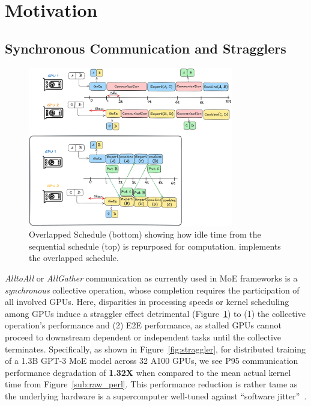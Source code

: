 \section{Motivation}\label{sec:motivation}
\subsection{Synchronous Communication and Stragglers}\label{sec:synchronous-communication-and-stragglers}
\begin{figure}[!ht]
    \centering
    \includegraphics[width=0.8\textwidth, keepaspectratio]{figures/s_overlap}
    \caption{Overlapped Schedule (bottom) showing how idle time from the sequential schedule (top)
        is repurposed for computation. \sysname implements the overlapped schedule.}
    \label{fig:overlap}
\end{figure}
\emph{AlltoAll} or \emph{AllGather} communication as currently used in MoE frameworks
is a \emph{synchronous} collective operation, whose completion requires the participation of all involved GPUs.
Here, disparities in processing speeds or kernel scheduling
among GPUs induce a straggler effect detrimental (Figure~\ref{fig:overlap}) to (1) the collective operation's performance and (2)
E2E performance, as stalled GPUs cannot proceed to downstream dependent or independent tasks until the collective terminates.
Specifically, as shown in Figure~\ref{fig:straggler}, for distributed training of a 1.3B GPT-3 MoE model across
32 A100 GPUs, we see P95 communication performance degradation of \textbf{1.32X} when compared to the mean actual kernel time
from Figure~\ref{sub:raw_perl}.
This performance reduction is rather tame as the underlying hardware is a supercomputer well-tuned
against ``software jitter''~\cite{nerscNetworkNERSC}.
